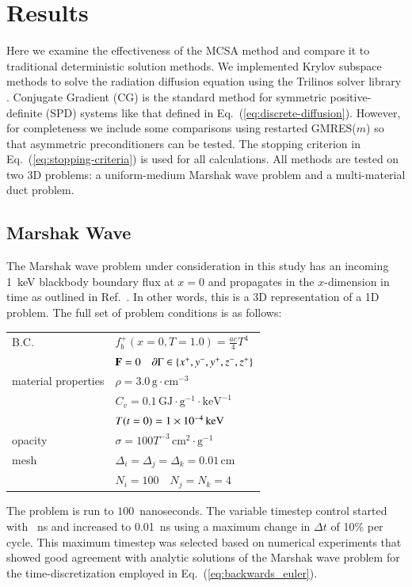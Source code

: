 \documentclass[preprint,12pt]{elsarticle}
\newcommand{\Cv}{\ensuremath{C_{v}}}
\newcommand{\Di}{\ensuremath{\Delta_i}}
\newcommand{\Dj}{\ensuremath{\Delta_j}}
\newcommand{\Dk}{\ensuremath{\Delta_k}}
\begin{document}
\section{Results}
\label{sec:results}

Here we examine the effectiveness of the MCSA method and compare it to
traditional deterministic solution methods.  We implemented Krylov subspace
methods to solve the radiation diffusion equation using the Trilinos solver
library \cite{1089021}.  Conjugate Gradient (CG) is the standard method for
symmetric positive-definite (SPD) systems like that defined in
Eq.~(\ref{eq:discrete-diffusion}).  However, for completeness we include some
comparisons using restarted GMRES($m$) so that asymmetric preconditioners can
be tested. The stopping criterion in Eq.~(\ref{eq:stopping-criteria}) is used
for all calculations. All methods are tested on two 3D problems: a
uniform-medium Marshak wave problem and a multi-material duct problem.

\subsection{Marshak Wave}

The Marshak wave problem under consideration in this study has an incoming
1~keV blackbody boundary flux at $x=0$ and propagates in the $x$-dimension in
time as outlined in Ref.~\cite{larsen_1980}.  In other words, this is a 3D
representation of a 1D problem.  The full set of problem conditions is as
follows:
\begin{center}
  \begin{tabular}{ll}\hline
    B.C. & $f_b^{+}(x=0,T=1.0) = \frac{ac}{4}T^4$ \\ & $\mathbf{F} =
    0\quad \partial\Gamma \in \{x^{+}, y^{-}, y^{+}, z^{-}, z^{+}\}$
    \\ material properties & $\rho =
    3.0\,\text{g}\cdot\text{cm}^{-3}$ \\ & $\Cv =
    0.1\,\text{GJ}\cdot\text{g}^{-1}\cdot\text{keV}^{-1}$\\ &
    $T(t=0) = 1\times 10^{-4}\,\text{keV}$\\  opacity & $\sigma =
    100T^{-3}\,\text{cm}^2\cdot\text{g}^{-1}$ \\  mesh & $\Di = \Dj
    = \Dk = 0.01\,\text{cm}$ \\ & $N_i = 100\quad N_j = N_k = 4$
    \\ \hline
  \end{tabular}
\end{center}
The problem is run to $100$~nanoseconds.  The variable timestep control
started with ~ns and increased to 0.01~ns using a maximum change
in $\Delta t$ of 10\% per cycle.  This maximum timestep was selected based on
numerical experiments that showed good agreement with analytic solutions of
the Marshak wave problem for the time-discretization employed in
Eq.~(\ref{eq:backwards_euler}).
\end{document}
